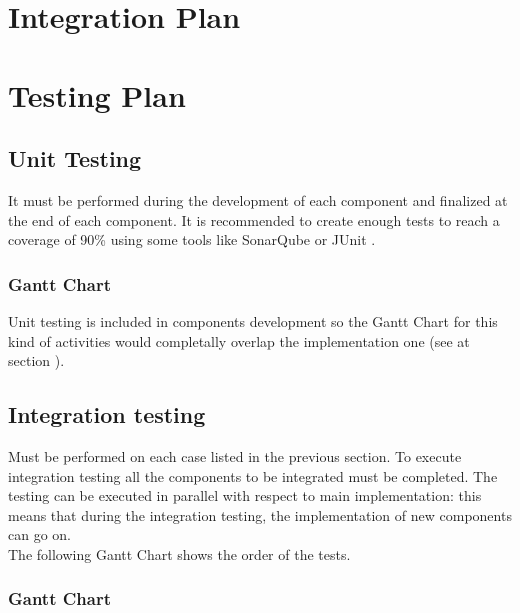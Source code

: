 \section{Integration Plan}

\section{Testing Plan}
	\subsection{Unit Testing}
	It must be performed during the development of each component and finalized at the end of each component. It is recommended to create enough tests to reach a coverage of 90\% using some tools like SonarQube or JUnit .
	\subsubsection{Gantt Chart}
	Unit testing is included in components development so the Gantt Chart for this kind of activities would completally overlap the implementation one (see at section ).
	\subsection{Integration testing} Must be performed on each case listed in the previous section. To execute integration testing all the components to be integrated must be completed. The testing can be executed in parallel with respect to main implementation: this means that during the integration testing, the implementation of new components can go on.\\
	The following Gantt Chart shows the order of the tests.
	\\
	\subsubsection{Gantt Chart}

\thispagestyle{fancy}
 
